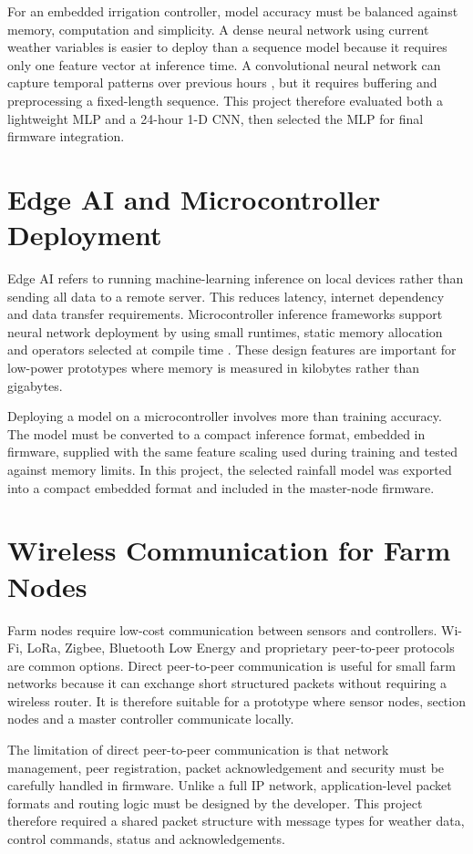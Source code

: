 \documentclass[12pt,a4paper]{report}
\begin{document}
For an embedded irrigation controller, model accuracy must be balanced against memory, computation and simplicity. A dense neural network using current weather variables is easier to deploy than a sequence model because it requires only one feature vector at inference time. A convolutional neural network can capture temporal patterns over previous hours \citep{lecun1998gradient}, but it requires buffering and preprocessing a fixed-length sequence. This project therefore evaluated both a lightweight MLP and a 24-hour 1-D CNN, then selected the MLP for final firmware integration.

\section{Edge AI and Microcontroller Deployment}
Edge AI refers to running machine-learning inference on local devices rather than sending all data to a remote server. This reduces latency, internet dependency and data transfer requirements. Microcontroller inference frameworks support neural network deployment by using small runtimes, static memory allocation and operators selected at compile time \citep{david2021tensorflow}. These design features are important for low-power prototypes where memory is measured in kilobytes rather than gigabytes.

Deploying a model on a microcontroller involves more than training accuracy. The model must be converted to a compact inference format, embedded in firmware, supplied with the same feature scaling used during training and tested against memory limits. In this project, the selected rainfall model was exported into a compact embedded format and included in the master-node firmware.

\section{Wireless Communication for Farm Nodes}
Farm nodes require low-cost communication between sensors and controllers. Wi-Fi, LoRa, Zigbee, Bluetooth Low Energy and proprietary peer-to-peer protocols are common options. Direct peer-to-peer communication is useful for small farm networks because it can exchange short structured packets without requiring a wireless router. It is therefore suitable for a prototype where sensor nodes, section nodes and a master controller communicate locally.

The limitation of direct peer-to-peer communication is that network management, peer registration, packet acknowledgement and security must be carefully handled in firmware. Unlike a full IP network, application-level packet formats and routing logic must be designed by the developer. This project therefore required a shared packet structure with message types for weather data, control commands, status and acknowledgements.
\end{document}
